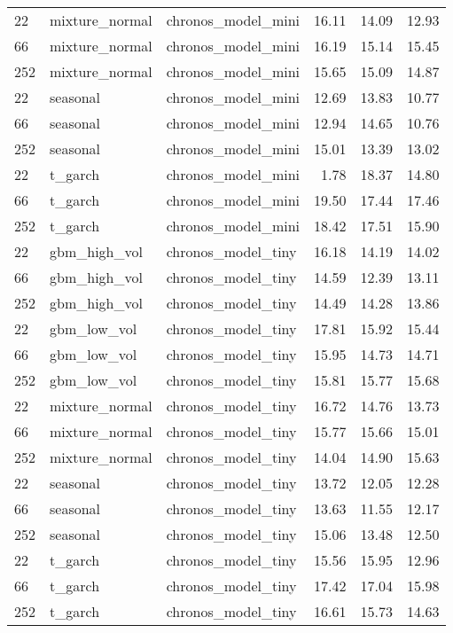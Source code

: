 {\begin{tabular}{lllrrr}
\midrule
22 & mixture\_normal & chronos\_model\_mini & 16.11 & 14.09 & 12.93 \\
66 & mixture\_normal & chronos\_model\_mini & 16.19 & 15.14 & 15.45 \\
252 & mixture\_normal & chronos\_model\_mini & 15.65 & 15.09 & 14.87 \\
\midrule
22 & seasonal & chronos\_model\_mini & 12.69 & 13.83 & 10.77 \\
66 & seasonal & chronos\_model\_mini & 12.94 & 14.65 & 10.76 \\
252 & seasonal & chronos\_model\_mini & 15.01 & 13.39 & 13.02 \\
\midrule
22 & t\_garch & chronos\_model\_mini & 1.78 & 18.37 & 14.80 \\
66 & t\_garch & chronos\_model\_mini & 19.50 & 17.44 & 17.46 \\
252 & t\_garch & chronos\_model\_mini & 18.42 & 17.51 & 15.90 \\
\midrule
22 & gbm\_high\_vol & chronos\_model\_tiny & 16.18 & 14.19 & 14.02 \\
66 & gbm\_high\_vol & chronos\_model\_tiny & 14.59 & 12.39 & 13.11 \\
252 & gbm\_high\_vol & chronos\_model\_tiny & 14.49 & 14.28 & 13.86 \\
\midrule
22 & gbm\_low\_vol & chronos\_model\_tiny & 17.81 & 15.92 & 15.44 \\
66 & gbm\_low\_vol & chronos\_model\_tiny & 15.95 & 14.73 & 14.71 \\
252 & gbm\_low\_vol & chronos\_model\_tiny & 15.81 & 15.77 & 15.68 \\
\midrule
22 & mixture\_normal & chronos\_model\_tiny & 16.72 & 14.76 & 13.73 \\
66 & mixture\_normal & chronos\_model\_tiny & 15.77 & 15.66 & 15.01 \\
252 & mixture\_normal & chronos\_model\_tiny & 14.04 & 14.90 & 15.63 \\
\midrule
22 & seasonal & chronos\_model\_tiny & 13.72 & 12.05 & 12.28 \\
66 & seasonal & chronos\_model\_tiny & 13.63 & 11.55 & 12.17 \\
252 & seasonal & chronos\_model\_tiny & 15.06 & 13.48 & 12.50 \\
\midrule
22 & t\_garch & chronos\_model\_tiny & 15.56 & 15.95 & 12.96 \\
66 & t\_garch & chronos\_model\_tiny & 17.42 & 17.04 & 15.98 \\
252 & t\_garch & chronos\_model\_tiny & 16.61 & 15.73 & 14.63 \\

\end{tabular}}
